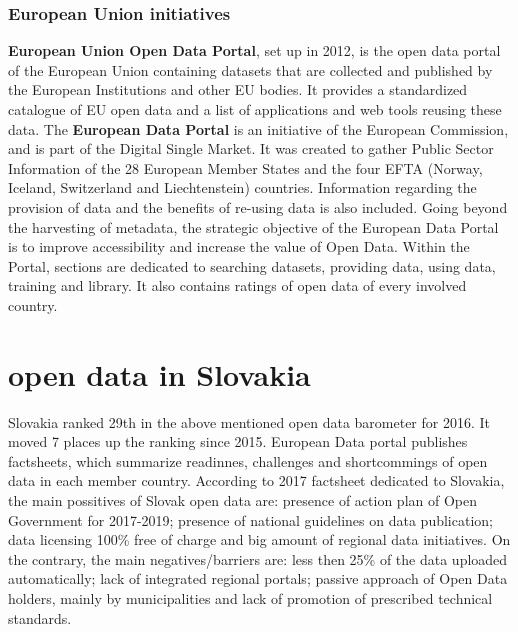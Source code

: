 \documentclass[thesis=B,english]{FITthesis}[2012/06/26]
\begin{document}
	\subsection{European Union initiatives}
	\label{euinitiatives}
\textbf{European Union Open Data Portal}, set up in 2012, is the open data portal of the European Union containing datasets that are collected and published by the European Institutions and other EU bodies. It provides a standardized catalogue of EU open data and a list of applications and web tools reusing these data. \cite{EUopendataportal}
\hspace{10000px}
The \textbf{European Data Portal} is an initiative of the European Commission, and is part of the Digital Single Market. It was created to gather Public Sector Information of the 28 European Member States and the four EFTA (Norway, Iceland, Switzerland and Liechtenstein) countries. Information regarding the provision of data and the benefits of re-using data is also included. Going beyond the harvesting of metadata, the strategic objective of the European Data Portal is to improve accessibility and increase the value of Open Data. Within the Portal, sections are dedicated to searching datasets, providing data, using data, training and library. It also contains ratings of open data of every involved country. \cite{eudataportal}

\chapter{open data in Slovakia}
	\label{opendatainslovakia}
	Slovakia ranked 29th in the above mentioned open data barometer for 2016. It moved 7 places up the ranking since 2015. European Data portal publishes factsheets, which summarize readinnes, challenges and shortcommings of open data in each member country. According to 2017 factsheet dedicated to Slovakia, the main possitives of Slovak open data are: presence of action plan of Open Government for 2017-2019; presence of national guidelines on data publication; data licensing 100\% free of charge and big amount of regional data initiatives. On the contrary, the main negatives/barriers are: less then 25\% of the data uploaded automatically; lack of integrated regional portals; passive approach of Open Data holders, mainly by municipalities and lack of promotion of prescribed technical standards. \cite{eudataportalfactsheet}
\end{document}
